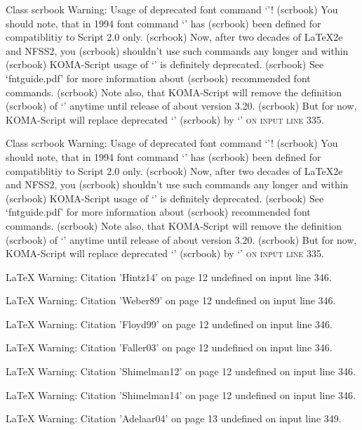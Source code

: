 Class scrbook Warning: Usage of deprecated font command `\sc'!
(scrbook)              You should note, that in 1994 font command `\sc' has
(scrbook)              been defined for compatiblitiy to Script 2.0 only.
(scrbook)              Now, after two decades of LaTeX2e and NFSS2, you
(scrbook)              shouldn't use such commands any longer and within
(scrbook)              KOMA-Script usage of `\sc' is definitely deprecated.
(scrbook)              See `fntguide.pdf' for more information about
(scrbook)              recommended font commands.
(scrbook)              Note also, that KOMA-Script will remove the definition
(scrbook)              of `\sc' anytime until release of about version 3.20.
(scrbook)              But for now, KOMA-Script will replace deprecated `\sc'
(scrbook)              by `\normalfont \scshape ' on input line 335.


Class scrbook Warning: Usage of deprecated font command `\sc'!
(scrbook)              You should note, that in 1994 font command `\sc' has
(scrbook)              been defined for compatiblitiy to Script 2.0 only.
(scrbook)              Now, after two decades of LaTeX2e and NFSS2, you
(scrbook)              shouldn't use such commands any longer and within
(scrbook)              KOMA-Script usage of `\sc' is definitely deprecated.
(scrbook)              See `fntguide.pdf' for more information about
(scrbook)              recommended font commands.
(scrbook)              Note also, that KOMA-Script will remove the definition
(scrbook)              of `\sc' anytime until release of about version 3.20.
(scrbook)              But for now, KOMA-Script will replace deprecated `\sc'
(scrbook)              by `\normalfont \scshape ' on input line 335.


LaTeX Warning: Citation 'Hintz14' on page 12 undefined on input line 346.


LaTeX Warning: Citation 'Weber89' on page 12 undefined on input line 346.


LaTeX Warning: Citation 'Floyd99' on page 12 undefined on input line 346.


LaTeX Warning: Citation 'Faller03' on page 12 undefined on input line 346.


LaTeX Warning: Citation 'Shimelman12' on page 12 undefined on input line 346.


LaTeX Warning: Citation 'Shimelman14' on page 12 undefined on input line 346.


LaTeX Warning: Citation 'Adelaar04' on page 13 undefined on input line 349.


